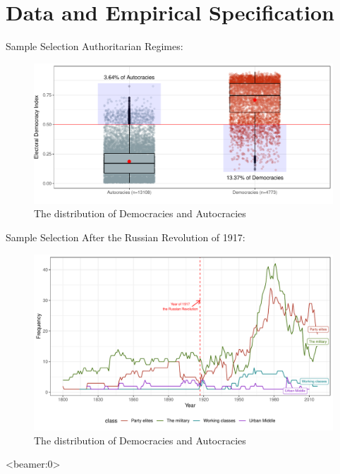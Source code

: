 \documentclass{Bredelebeamer}
\begin{document}
\section{Data and Empirical Specification}
\begin{frame}{Sample Selection}
Authoritarian Regimes: \centering
\begin{figure}[!htbt]
	\centering
	\includegraphics[width=0.85\linewidth]{"../3. Datasets_Codebooks/Figures/Plot1"}
	\caption{The distribution of Democracies and Autocracies}
	\label{fig:plot1}
\end{figure}
\end{frame}	

\begin{frame}{Sample Selection}
After the Russian Revolution of 1917: \centering
\begin{figure}[!htbt]
	\centering
	\includegraphics[width=0.9\linewidth]{"../3. Datasets_Codebooks/Figures/Plot3"}
	\caption{The distribution of Democracies and Autocracies}
	\label{fig:plot2}
\end{figure}
\end{frame}



\begin{frame}<beamer:0>
	
	
\end{frame}
\end{document}
